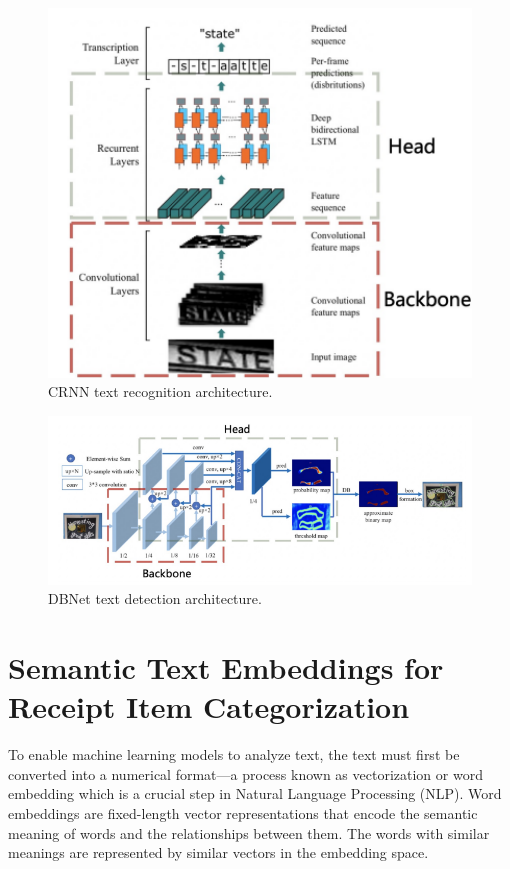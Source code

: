 \documentclass{SGGW-thesis-EN}
\begin{document}
\begin{figure}[h!]
  \centering
  \includegraphics[width=1\textwidth]{images/cnn_text_recognizer.png}
  \caption{CRNN text recognition architecture. \cite{shi2015e2etnn}}
  \label{fig:cnn_text_recognizer}
  \end{figure}
\begin{figure}[h!]
  \centering
    \includegraphics[width=1\textwidth]{images/text_detector_db.png}
    \caption{DBNet text detection architecture. \cite{liao2019rttextdet}}
    \label{fig:text_detector_db}
  \end{figure}

\newpage
\section{Semantic Text Embeddings for Receipt Item Categorization}
To enable machine learning models to analyze text, the text must first be converted into a numerical format—a process known as vectorization or word embedding which is a crucial step in Natural Language Processing (NLP).
Word embeddings are fixed-length vector representations that encode the semantic meaning of words and the relationships between them. 
The words with similar meanings are represented by similar vectors in the embedding space.\cite{almeida2023wordembeddingssurvey}
\end{document}
